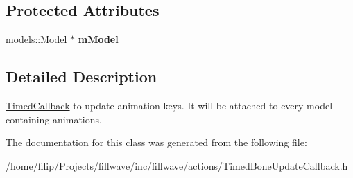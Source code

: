 \subsection*{Protected Attributes}
\begin{DoxyCompactItemize}
\item 
\hypertarget{classfillwave_1_1actions_1_1TimedBoneUpdateCallback_a0ce30077e53db951f9f834084826c873}{}\hyperlink{classfillwave_1_1models_1_1Model}{models\+::\+Model} $\ast$ {\bfseries m\+Model}\label{classfillwave_1_1actions_1_1TimedBoneUpdateCallback_a0ce30077e53db951f9f834084826c873}

\end{DoxyCompactItemize}


\subsection{Detailed Description}
\hyperlink{classfillwave_1_1actions_1_1TimedCallback}{Timed\+Callback} to update animation keys. It will be attached to every model containing animations. 

The documentation for this class was generated from the following file\+:\begin{DoxyCompactItemize}
\item 
/home/filip/\+Projects/fillwave/inc/fillwave/actions/Timed\+Bone\+Update\+Callback.\+h\end{DoxyCompactItemize}
